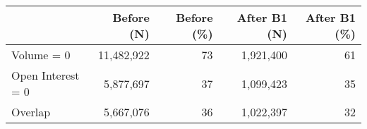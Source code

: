 \begin{tabular}{lrrrr}
\toprule
 & Before (N) & Before (\%) & After B1 (N) & After B1 (\%) \\
\midrule
Volume = 0 & 11,482,922 & 73 & 1,921,400 & 61 \\
Open Interest = 0 & 5,877,697 & 37 & 1,099,423 & 35 \\
Overlap & 5,667,076 & 36 & 1,022,397 & 32 \\
\bottomrule
\end{tabular}
